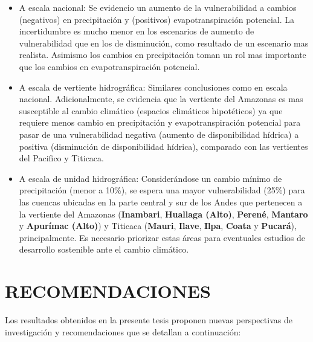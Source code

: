 \documentclass[12pt]{article}
\begin{document}
\begin{itemize}
    \begin{itemize}
        \item A escala nacional: Se evidencio un aumento de la vulnerabilidad a cambios (negativos) en precipitación y (positivos) evapotranspiración potencial. La incertidumbre es mucho menor en los escenarios de aumento de vulnerabilidad que en los de disminución, como resultado de un escenario mas realista. Asimismo los cambios en precipitación toman un rol mas importante que los cambios en evapotranspiración potencial. 
        \item A escala de vertiente hidrográfica: Similares conclusiones como en escala nacional. Adicionalmente, se evidencia que la vertiente del Amazonas es mas susceptible al cambio climático (espacios climáticos hipotéticos) ya que requiere menos cambio en precipitación y evapotranspiración potencial para pasar de una vulnerabilidad negativa (aumento de disponibilidad hídrica) a positiva (disminución de disponibilidad hídrica), comparado con las vertientes del Pacifico y Titicaca.
        \item A escala de unidad hidrográfica: Considerándose un cambio mínimo de precipitación (menor a 10\%), se espera una mayor vulnerabilidad (25\%) para las cuencas ubicadas en la parte central y sur de los Andes que pertenecen a la vertiente del Amazonas (\textbf{Inambari}, \textbf{Huallaga (Alto)}, \textbf{Perené}, \textbf{Mantaro} y \textbf{Apurímac (Alto)}) y Titicaca (\textbf{Mauri}, \textbf{Ilave}, \textbf{Ilpa}, \textbf{Coata} y \textbf{Pucará}), principalmente. Es necesario priorizar estas áreas para eventuales estudios de desarrollo sostenible ante el cambio climático.
    \end{itemize}
    
\end{itemize}


\clearpage
\vspace*{0.5mm}
\section{RECOMENDACIONES}

Los resultados obtenidos en la presente tesis proponen nuevas perspectivas de investigación y recomendaciones que se detallan a continuación:
\end{document}

